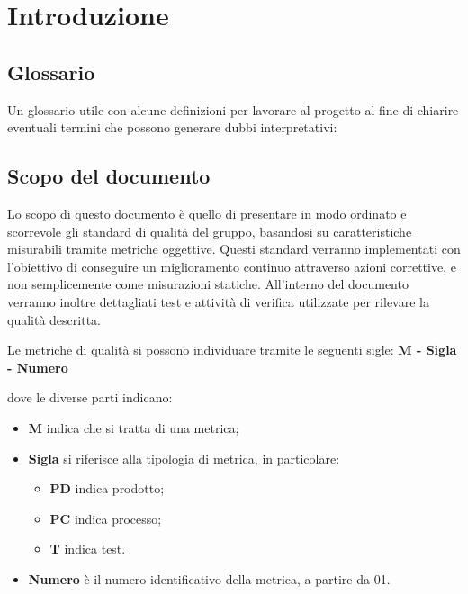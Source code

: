 \chapter{Introduzione}

\section{Glossario}
Un glossario utile con alcune definizioni per lavorare al progetto al fine di chiarire eventuali termini che possono generare dubbi interpretativi:

\section{Scopo del documento}
Lo scopo di questo documento è quello di presentare in modo ordinato e scorrevole gli standard di qualità del gruppo, basandosi su caratteristiche misurabili tramite metriche oggettive. Questi standard verranno implementati con l'obiettivo di conseguire un miglioramento continuo attraverso azioni correttive, e non semplicemente come misurazioni statiche. All'interno del documento verranno inoltre dettagliati test e attività di verifica utilizzate per rilevare la qualità descritta.

Le metriche di qualità si possono individuare tramite le seguenti sigle: \textbf{M - Sigla - Numero}

dove le diverse parti indicano:

\begin{itemize}
    \item \textbf{M} indica che si tratta di una metrica;
    \item \textbf{Sigla} si riferisce alla tipologia di metrica, in particolare:
    \begin{itemize}
        \item \textbf{PD} indica prodotto;
        \item \textbf{PC} indica processo;
        \item \textbf{T} indica test.
    \end{itemize}
    \item \textbf{Numero} è il numero identificativo della metrica, a partire da 01.
\end{itemize}

